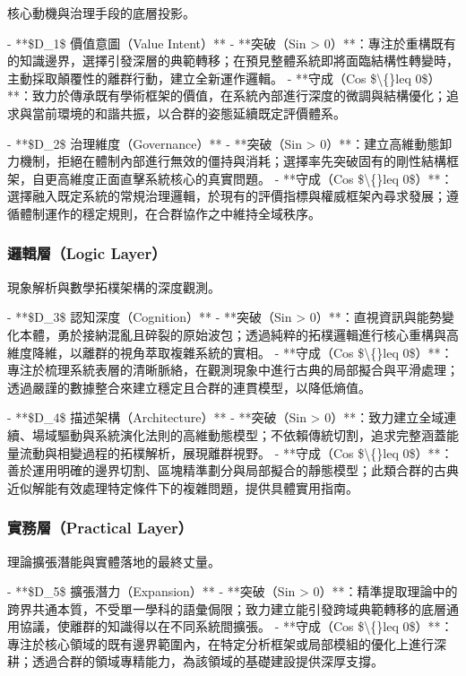 \documentclass{article}
\begin{document}
核心動機與治理手段的底層投影。

- **\$D\_1\$ 價值意圖（Value Intent）**
  - **突破（Sin > 0）**：專注於重構既有的知識邊界，選擇引發深層的典範轉移；在預見整體系統即將面臨結構性轉變時，主動採取顛覆性的離群行動，建立全新運作邏輯。
  - **守成（Cos \$\textbackslash\{\}leq 0\$）**：致力於傳承既有學術框架的價值，在系統內部進行深度的微調與結構優化；追求與當前環境的和諧共振，以合群的姿態延續既定評價體系。

- **\$D\_2\$ 治理維度（Governance）**
  - **突破（Sin > 0）**：建立高維動態卸力機制，拒絕在體制內部進行無效的僵持與消耗；選擇率先突破固有的剛性結構框架，自更高維度正面直擊系統核心的真實問題。
  - **守成（Cos \$\textbackslash\{\}leq 0\$）**：選擇融入既定系統的常規治理邏輯，於現有的評價指標與權威框架內尋求發展；遵循體制運作的穩定規則，在合群協作之中維持全域秩序。

\subsubsection{邏輯層（Logic Layer）}

現象解析與數學拓樸架構的深度觀測。

- **\$D\_3\$ 認知深度（Cognition）**
  - **突破（Sin > 0）**：直視資訊與能勢變化本體，勇於接納混亂且碎裂的原始波包；透過純粹的拓樸邏輯進行核心重構與高維度降維，以離群的視角萃取複雜系統的實相。
  - **守成（Cos \$\textbackslash\{\}leq 0\$）**：專注於梳理系統表層的清晰脈絡，在觀測現象中進行古典的局部擬合與平滑處理；透過嚴謹的數據整合來建立穩定且合群的連貫模型，以降低熵值。

- **\$D\_4\$ 描述架構（Architecture）**
  - **突破（Sin > 0）**：致力建立全域連續、場域驅動與系統演化法則的高維動態模型；不依賴傳統切割，追求完整涵蓋能量流動與相變過程的拓樸解析，展現離群視野。
  - **守成（Cos \$\textbackslash\{\}leq 0\$）**：善於運用明確的邊界切割、區塊精準劃分與局部擬合的靜態模型；此類合群的古典近似解能有效處理特定條件下的複雜問題，提供具體實用指南。

\subsubsection{實務層（Practical Layer）}

理論擴張潛能與實體落地的最終丈量。

- **\$D\_5\$ 擴張潛力（Expansion）**
  - **突破（Sin > 0）**：精準提取理論中的跨界共通本質，不受單一學科的語彙侷限；致力建立能引發跨域典範轉移的底層通用協議，使離群的知識得以在不同系統間擴張。
  - **守成（Cos \$\textbackslash\{\}leq 0\$）**：專注於核心領域的既有邊界範圍內，在特定分析框架或局部模組的優化上進行深耕；透過合群的領域專精能力，為該領域的基礎建設提供深厚支撐。
\end{document}
